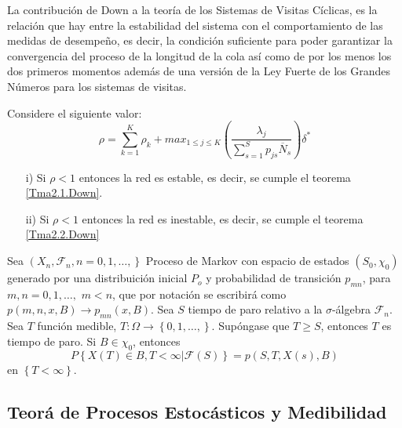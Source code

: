 La contribuci\'on de Down a la teor\'ia de los Sistemas de Visitas
C\'iclicas, es la relaci\'on que hay entre la estabilidad del
sistema con el comportamiento de las medidas de desempe\~no, es
decir, la condici\'on suficiente para poder garantizar la
convergencia del proceso de la longitud de la cola as\'i como de
por los menos los dos primeros momentos adem\'as de una versi\'on
de la Ley Fuerte de los Grandes N\'umeros para los sistemas de
visitas.


\begin{Teo}\label{Tma2.3.Down}
Considere el siguiente valor:
\begin{equation}\label{Eq.Rho.1serv}
\rho=\sum_{k=1}^{K}\rho_{k}+max_{1\leq j\leq K}\left(\frac{\lambda_{j}}{\sum_{s=1}^{S}p_{js}\overline{N}_{s}}\right)\delta^{*}
\end{equation}
\begin{itemize}
\item[i)] Si $\rho<1$ entonces la red es estable, es decir, se cumple el teorema \ref{Tma2.1.Down}.

\item[ii)] Si $\rho<1$ entonces la red es inestable, es decir, se cumple el teorema \ref{Tma2.2.Down}
\end{itemize}
\end{Teo}

\begin{Teo}
Sea $\left(X_{n},\mathcal{F}_{n},n=0,1,\ldots,\right\}$ Proceso de
Markov con espacio de estados $\left(S_{0},\chi_{0}\right)$
generado por una distribuici\'on inicial $P_{o}$ y probabilidad de
transici\'on $p_{mn}$, para $m,n=0,1,\ldots,$ $m<n$, que por
notaci\'on se escribir\'a como $p\left(m,n,x,B\right)\rightarrow
p_{mn}\left(x,B\right)$. Sea $S$ tiempo de paro relativo a la
$\sigma$-\'algebra $\mathcal{F}_{n}$. Sea $T$ funci\'on medible,
$T:\Omega\rightarrow\left\{0,1,\ldots,\right\}$. Sup\'ongase que
$T\geq S$, entonces $T$ es tiempo de paro. Si $B\in\chi_{0}$,
entonces
\begin{equation}\label{Prop.Fuerte.Markov}
P\left\{X\left(T\right)\in
B,T<\infty|\mathcal{F}\left(S\right)\right\} =
p\left(S,T,X\left(s\right),B\right)
\end{equation}
en $\left\{T<\infty\right\}$.
\end{Teo}

\subsection{Teor\'a de Procesos Estoc\'asticos y Medibilidad}

